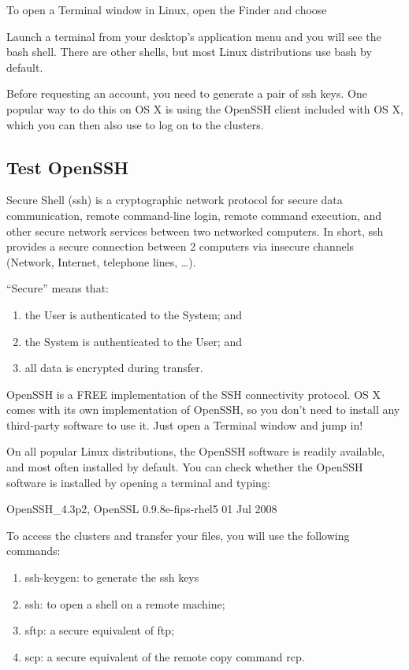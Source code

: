 \iflinux
  To open a Terminal window in Linux, open the Finder and choose

  Launch a terminal from your desktop’s application menu and you will see the bash shell. 
  There are other shells, but most Linux distributions use bash by default.
\fi

\ifmacORlinux
  Before requesting an account, you need to generate a pair of ssh keys. One
  popular way to do this on OS X is using the OpenSSH client included with OS
  X, which you can then also use to log on to the clusters.

  \subsection{Test OpenSSH}
  \label{sec:test-openssh}

  Secure Shell (ssh) is a cryptographic network protocol for secure data
  communication, remote command-line login, remote command execution, and other
  secure network services between two networked computers. In short, ssh
  provides a secure connection between 2 computers via insecure channels
  (Network, Internet, telephone lines, \ldots).

  ``Secure'' means that:
  \begin{enumerate}
    \item  the User is authenticated to the System; and
    \item  the System is authenticated to the User; and
    \item  all data is encrypted during transfer.
  \end{enumerate}

  OpenSSH is a FREE implementation of the SSH connectivity protocol. OS X comes
  with its own implementation of OpenSSH, so you don't need to install any
  third-party software to use it. Just open a Terminal window and jump in!

  On all popular Linux distributions, the OpenSSH software is readily
  available, and most often installed by default. You can check whether the
  OpenSSH software is installed by opening a terminal and typing:

\begin{prompt}
OpenSSH_4.3p2, OpenSSL 0.9.8e-fips-rhel5 01 Jul 2008
\end{prompt}

  To access the clusters and transfer your files, you will use the following commands:

  \begin{enumerate}
    \item  ssh-keygen: to generate the ssh keys
    \item  ssh: to open a shell on a remote machine;
    \item  sftp: a secure equivalent of ftp;
    \item  scp: a secure equivalent of the remote copy command rcp.
  \end{enumerate}

